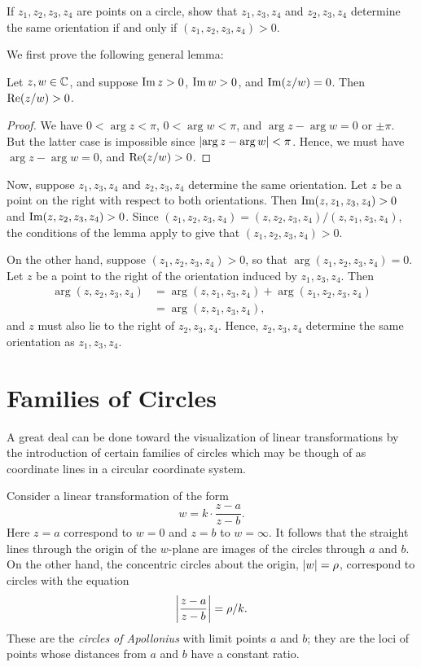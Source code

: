 \begin{exercise}
	If $z_1,z_2,z_3,z_4$ are points on a circle, show that $z_1,z_3,z_4$ and $z_2,z_3,z_4$ determine the same orientation if and only if $(z_1,z_2,z_3,z_4)>0$.
	\begin{sol}
		We first prove the following general lemma:
		\begin{lemma}
			Let $z,w \in \mathbb C$, and suppose $\operatorname{Im} z>0$, $\operatorname{Im} w>0$, and $\operatorname{Im} (z/w)=0$. Then $\operatorname{Re} (z/w)>0$.
		\end{lemma}
		\begin{proof}
			We have $0<\arg z<\pi$, $0<\arg w<\pi$, and $\arg z-\arg w=0$ or $\pm \pi$. But the latter case is impossible since $\lvert \arg z-\arg w \rvert<\pi$. Hence, we must have $\arg z-\arg w=0$, and $\operatorname{Re} (z/w)>0$.
		\end{proof}
		
		Now, suppose $z_1,z_3,z_4$ and $z_2,z_3,z_4$ determine the same orientation. Let $z$ be a point on the right with respect to both orientations. Then $\operatorname{Im} (z,z_1, z_3,z_4)>0$ and $\operatorname{Im} (z,z_2,z_3,z_4)>0$. Since $(z_1,z_2,z_3,z_4)=(z,z_2,z_3,z_4)/(z,z_1,z_3,z_4)$, the conditions of the lemma apply to give that $(z_1,z_2,z_3,z_4)>0$.
		
		On the other hand, suppose $(z_1,z_2,z_3,z_4)>0$, so that $\arg (z_1,z_2,z_3,z_4)=0$. Let $z$ be a point to the right of the orientation induced by $z_1,z_3,z_4$. Then
		\begin{align*}
			\arg (z,z_2,z_3,z_4) &=\arg (z, z_1,z_3,z_4)+\arg(z_1,z_2,z_3,z_4) \\
			&=\arg (z,z_1,z_3,z_4),
		\end{align*}
		and $z$ must also lie to the right of $z_2,z_3,z_4$. Hence, $z_2,z_3,z_4$ determine the same orientation as $z_1,z_3,z_4$.
	\end{sol}
\end{exercise}

\section{Families of Circles}
A great deal can be done toward the visualization of linear transformations by the introduction of certain families of circles which may be though of as coordinate lines in a circular coordinate system.

Consider a linear transformation of the form $$w=k \cdot \dfrac{z-a}{z-b}.$$ Here $z=a$ correspond to $w=0$ and $z=b$ to $w=\infty$. It follows that the straight lines through the origin of the $w$-plane are images of the circles through $a$ and $b$. On the other hand, the concentric circles about the origin, $\lvert w \rvert=\rho$, correspond to circles with the equation $$\left\lvert \dfrac{z-a}{z-b}\right \rvert=\rho/k.$$ These are the \textit{circles of Apollonius} with limit points $a$ and $b$; they are the loci of points whose distances from $a$ and $b$ have a constant ratio.

